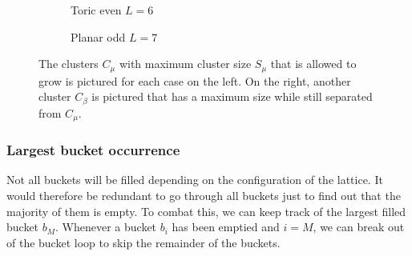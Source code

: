 \begin{figure}[h]
\begin{subfigure}{0.45\linewidth}
    \caption{Toric even $L=6$}
  \end{subfigure}
  \begin{subfigure}{0.45\linewidth}
    \centering
    \caption{Planar odd $L=7$}
  \end{subfigure}
  \caption{The clusters $C_\mu$ with maximum cluster size $S_\mu$ that is allowed to grow is pictured for each case on the left. On the right, another cluster $C_\beta$ is pictured that has a maximum size while still separated from $C_\mu$.}\label{fig:bucket_cmsizes}
\end{figure}


\subsubsection{Largest bucket occurrence}
Not all buckets will be filled depending on the configuration of the lattice. It would therefore be redundant to go through all buckets just to find out that the majority of them is empty. To combat this, we can keep track of the largest filled bucket $b_M$. Whenever a bucket $b_i$ has been emptied and $i = M$, we can break out of the bucket loop to skip the remainder of the buckets.

